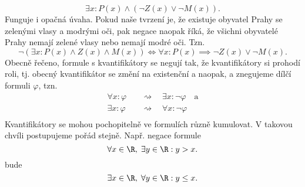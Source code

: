 \begin{equation*}
    \exists x : P(x)\land (\neg Z(x) \lor \neg M(x)).
\end{equation*}
Funguje i opačná úvaha. Pokud naše tvrzení je, že existuje obyvatel Prahy se zelenými vlasy a modrými oči, pak negace naopak říká, že všichni obyvatelé Prahy nemají zelené vlasy nebo nemají modré oči. Tzn.
\begin{equation*}
    \neg(\exists x : P(x)\land Z(x) \land M(x)) \iff \forall x : P(x)\implies \neg Z(x) \lor \neg M(x).
\end{equation*}
Obecně řečeno, formule s kvantifikátory se negují tak, že kvantifikátory si prohodí roli, tj. obecný kvantifikátor se změní na existenční a naopak, a znegujeme dílčí formuli $\varphi$, tzn.
\begin{align*}
    \forall x : \varphi\quad&\rightsquigarrow\quad\exists x : \neg\varphi\quad\text{a}\\
    \exists x : \varphi\quad&\rightsquigarrow\quad\forall x : \neg\varphi\\
\end{align*}
Kvantifikátory se mohou pochopitelně ve formulích různě kumulovat. V takovou chvíli postupujeme pořád stejně. Např. negace formule
\begin{equation*}
    \forall x\in\R,\;\exists y\in\R : y > x.
\end{equation*}
bude
\begin{equation*}
    \exists x\in\R,\;\forall y\in\R : y \leq x.
\end{equation*}